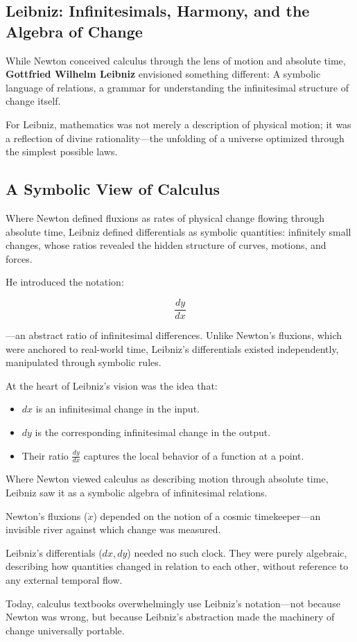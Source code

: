 \subsection{Leibniz: Infinitesimals, Harmony, and the Algebra of Change}

While Newton conceived calculus through the lens of motion and absolute time, \textbf{Gottfried Wilhelm Leibniz} envisioned something different:  
A symbolic language of relations, a grammar for understanding the infinitesimal structure of change itself.

For Leibniz, mathematics was not merely a description of physical motion; it was a reflection of divine rationality—the unfolding of a universe optimized through the simplest possible laws.

\subsection{A Symbolic View of Calculus}

Where Newton defined fluxions as rates of physical change flowing through absolute time, Leibniz defined differentials as symbolic quantities: infinitely small changes, whose ratios revealed the hidden structure of curves, motions, and forces.

He introduced the notation:

\[
\frac{dy}{dx}
\]

—an abstract ratio of infinitesimal differences. Unlike Newton’s fluxions, which were anchored to real-world time, Leibniz's differentials existed independently, manipulated through symbolic rules.

At the heart of Leibniz’s vision was the idea that:

\begin{itemize}
    \item \( dx \) is an infinitesimal change in the input.
    \item \( dy \) is the corresponding infinitesimal change in the output.
    \item Their ratio \( \frac{dy}{dx} \) captures the local behavior of a function at a point.
\end{itemize}

\begin{tcolorbox}[colback=gray!5!white, colframe=black, title=\textbf{Historical Sidebar: Leibniz’s Notation vs Newton’s Fluxions}, fonttitle=\bfseries, arc=1.5mm, boxrule=0.4pt]
Where Newton viewed calculus as describing motion through absolute time, Leibniz saw it as a symbolic algebra of infinitesimal relations.

Newton's fluxions (\( \dot{x} \)) depended on the notion of a cosmic timekeeper—an invisible river against which change was measured.

Leibniz’s differentials (\( dx, dy \)) needed no such clock. They were purely algebraic, describing how quantities changed in relation to each other, without reference to any external temporal flow.

Today, calculus textbooks overwhelmingly use Leibniz’s notation—not because Newton was wrong, but because Leibniz’s abstraction made the machinery of change universally portable.
\end{tcolorbox}

